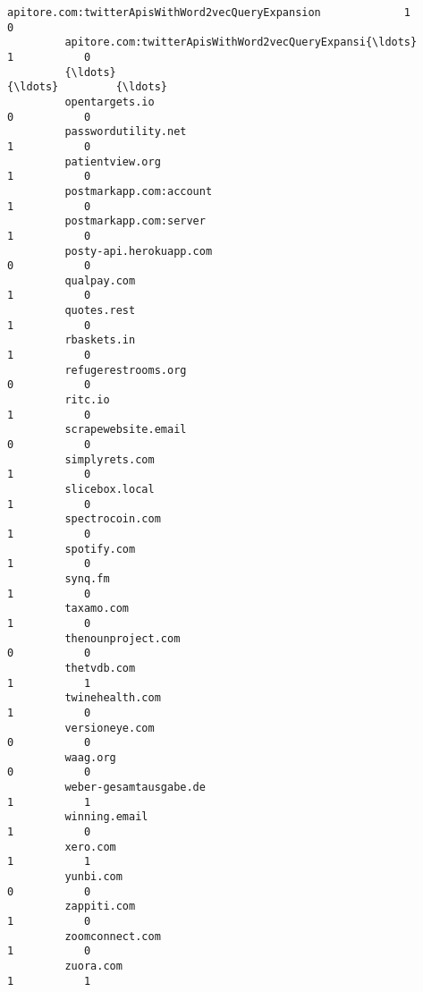 \documentclass[11pt]{article}
\begin{document}
\begin{Verbatim}[commandchars=\\\{\}]
         apitore.com:twitterApisWithWord2vecQueryExpansion             1           0   
         apitore.com:twitterApisWithWord2vecQueryExpansi{\ldots}            1           0   
         {\ldots}                                                         {\ldots}         {\ldots}   
         opentargets.io                                                0           0   
         passwordutility.net                                           1           0   
         patientview.org                                               1           0   
         postmarkapp.com:account                                       1           0   
         postmarkapp.com:server                                        1           0   
         posty-api.herokuapp.com                                       0           0   
         qualpay.com                                                   1           0   
         quotes.rest                                                   1           0   
         rbaskets.in                                                   1           0   
         refugerestrooms.org                                           0           0   
         ritc.io                                                       1           0   
         scrapewebsite.email                                           0           0   
         simplyrets.com                                                1           0   
         slicebox.local                                                1           0   
         spectrocoin.com                                               1           0   
         spotify.com                                                   1           0   
         synq.fm                                                       1           0   
         taxamo.com                                                    1           0   
         thenounproject.com                                            0           0   
         thetvdb.com                                                   1           1   
         twinehealth.com                                               1           0   
         versioneye.com                                                0           0   
         waag.org                                                      0           0   
         weber-gesamtausgabe.de                                        1           1   
         winning.email                                                 1           0   
         xero.com                                                      1           1   
         yunbi.com                                                     0           0   
         zappiti.com                                                   1           0   
         zoomconnect.com                                               1           0   
         zuora.com                                                     1           1   
         

\end{Verbatim}
\end{document}

